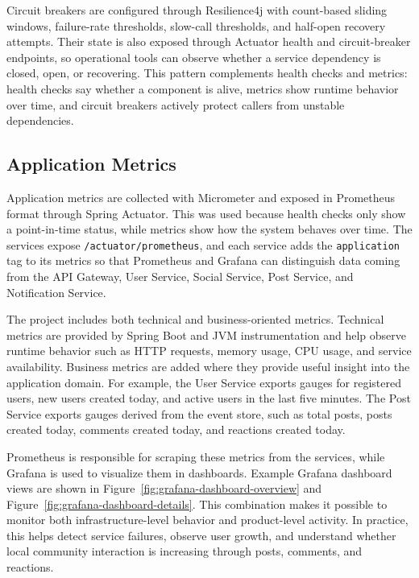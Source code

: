 \documentclass[12pt,a4paper]{article}
\begin{document}
Circuit breakers are configured through Resilience4j with count-based sliding windows, failure-rate thresholds, slow-call thresholds, and half-open recovery attempts. Their state is also exposed through Actuator health and circuit-breaker endpoints, so operational tools can observe whether a service dependency is closed, open, or recovering. This pattern complements health checks and metrics: health checks say whether a component is alive, metrics show runtime behavior over time, and circuit breakers actively protect callers from unstable dependencies.

\subsection{Application Metrics}

Application metrics are collected with Micrometer and exposed in Prometheus format through Spring Actuator. This was used because health checks only show a point-in-time status, while metrics show how the system behaves over time. The services expose \texttt{/actuator/prometheus}, and each service adds the \texttt{application} tag to its metrics so that Prometheus and Grafana can distinguish data coming from the API Gateway, User Service, Social Service, Post Service, and Notification Service.

The project includes both technical and business-oriented metrics. Technical metrics are provided by Spring Boot and JVM instrumentation and help observe runtime behavior such as HTTP requests, memory usage, CPU usage, and service availability. Business metrics are added where they provide useful insight into the application domain. For example, the User Service exports gauges for registered users, new users created today, and active users in the last five minutes. The Post Service exports gauges derived from the event store, such as total posts, posts created today, comments created today, and reactions created today.

Prometheus is responsible for scraping these metrics from the services, while Grafana is used to visualize them in dashboards. Example Grafana dashboard views are shown in Figure~\ref{fig:grafana-dashboard-overview} and Figure~\ref{fig:grafana-dashboard-details}. This combination makes it possible to monitor both infrastructure-level behavior and product-level activity. In practice, this helps detect service failures, observe user growth, and understand whether local community interaction is increasing through posts, comments, and reactions.
\end{document}
